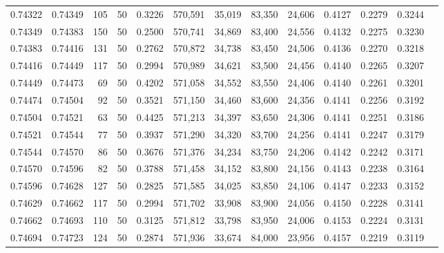 \begin{tabular}{rrrrrrrrrrrrr}
0.74322 & 0.74349 &   105 &  50 &                                     0.3226 & 570,591 &  35,019 &  83,350 &  24,606 & 0.4127 & 0.2279 & 0.3244 \\
0.74349 & 0.74383 &   150 &  50 &                                     0.2500 & 570,741 &  34,869 &  83,400 &  24,556 & 0.4132 & 0.2275 & 0.3230 \\
0.74383 & 0.74416 &   131 &  50 &                                     0.2762 & 570,872 &  34,738 &  83,450 &  24,506 & 0.4136 & 0.2270 & 0.3218 \\
0.74416 & 0.74449 &   117 &  50 &                                     0.2994 & 570,989 &  34,621 &  83,500 &  24,456 & 0.4140 & 0.2265 & 0.3207 \\
0.74449 & 0.74473 &    69 &  50 &                                     0.4202 & 571,058 &  34,552 &  83,550 &  24,406 & 0.4140 & 0.2261 & 0.3201 \\
0.74474 & 0.74504 &    92 &  50 &                                     0.3521 & 571,150 &  34,460 &  83,600 &  24,356 & 0.4141 & 0.2256 & 0.3192 \\
0.74504 & 0.74521 &    63 &  50 &                                     0.4425 & 571,213 &  34,397 &  83,650 &  24,306 & 0.4141 & 0.2251 & 0.3186 \\
0.74521 & 0.74544 &    77 &  50 &                                     0.3937 & 571,290 &  34,320 &  83,700 &  24,256 & 0.4141 & 0.2247 & 0.3179 \\
0.74544 & 0.74570 &    86 &  50 &                                     0.3676 & 571,376 &  34,234 &  83,750 &  24,206 & 0.4142 & 0.2242 & 0.3171 \\
0.74570 & 0.74596 &    82 &  50 &                                     0.3788 & 571,458 &  34,152 &  83,800 &  24,156 & 0.4143 & 0.2238 & 0.3164 \\
0.74596 & 0.74628 &   127 &  50 &                                     0.2825 & 571,585 &  34,025 &  83,850 &  24,106 & 0.4147 & 0.2233 & 0.3152 \\
0.74629 & 0.74662 &   117 &  50 &                                     0.2994 & 571,702 &  33,908 &  83,900 &  24,056 & 0.4150 & 0.2228 & 0.3141 \\
0.74662 & 0.74693 &   110 &  50 &                                     0.3125 & 571,812 &  33,798 &  83,950 &  24,006 & 0.4153 & 0.2224 & 0.3131 \\
0.74694 & 0.74723 &   124 &  50 &                                     0.2874 & 571,936 &  33,674 &  84,000 &  23,956 & 0.4157 & 0.2219 & 0.3119 \\

\end{tabular}
